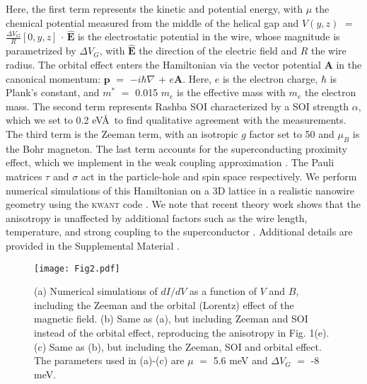 Here, the first term represents the kinetic and potential energy, with $\mu$ the chemical potential measured from the middle of the helical gap and $V(y,z)$ $=$ $\frac{\Delta V_G}{R}[0,y,z]$ $\cdot$ $\mathbf{\hat{E}}$ is the electrostatic potential in the wire, whose magnitude is parametrized by $\Delta V_G$, with $\mathbf{\hat{E}}$ the direction of the electric field and $R$ the wire radius. The orbital effect enters the Hamiltonian via the vector potential $\mathbf{A}$ in the canonical momentum: $\mathbf{p}$ $=$ $-i\hbar \nabla$ $+$ $e\mathbf{A}$. Here, $e$ is the electron charge, $\hbar$ is Plank's constant, and $m^*$ $=$ 0.015 $m_e$ is the effective mass with $m_e$ the electron mass. The second term represents Rashba SOI characterized by a SOI strength $\alpha$, which we set to 0.2 eV\AA\ to find qualitative agreement with the measurements. The third term is the Zeeman term, with an isotropic $g$ factor set to 50 and $\mu_B$ is the Bohr magneton. The last term accounts for the superconducting proximity effect, which we implement in the weak coupling approximation \cite{Nijholt2016}. The Pauli matrices $\tau$ and $\sigma$ act in the particle-hole and spin space respectively. We perform numerical simulations of this Hamiltonian on a 3D lattice in a realistic nanowire geometry using the \textsc{kwant} code \cite{Groth2014}. We note that recent theory work shows that the anisotropy is unaffected by additional factors such as the wire length, temperature, and strong coupling to the superconductor \cite{Liu2019}. Additional details are provided in the Supplemental Material \cite{Note1}.
\begin{figure}
\texttt{[image: Fig2.pdf]}
\caption{\label{fig2}
    (a) Numerical simulations of $dI/dV$ as a function of $V$ and $B$, including the Zeeman and the orbital (Lorentz) effect of the magnetic field. (b) Same as (a), but including Zeeman and SOI instead of the orbital effect, reproducing the anisotropy in Fig. 1(e). (c) Same as (b), but including the Zeeman, SOI and orbital effect. The parameters used in (a)-(c) are $\mu$ $=$ 5.6 meV and $\Delta V_G$ $=$ -8 meV.
}
\end{figure}
\\ \indent
